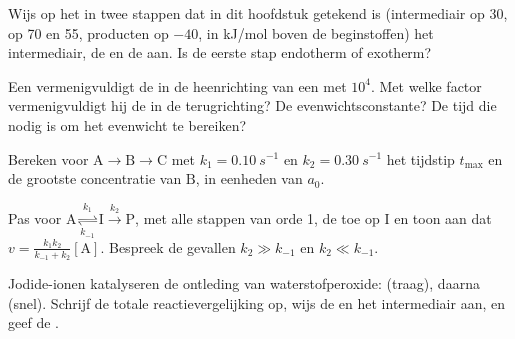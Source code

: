 \begin{exercise}[$\star$]\label{exo:b1:elementary-steps:3}
Wijs op het  in twee stappen dat in dit hoofdstuk getekend
is (intermediair op 30,  op 70 en 55, producten op
$-40$, in \unit{kJ/mol} boven de beginstoffen) het intermediair, de
 en de  aan. Is de eerste stap
endotherm of exotherm?
\end{exercise}

\begin{exercise}[$\star$]\label{exo:b1:elementary-steps:4}
Een  vermenigvuldigt de  in de heenrichting
van een  met $10^4$. Met welke factor vermenigvuldigt hij
de  in de terugrichting? De evenwichtsconstante? De
tijd die nodig is om het evenwicht te bereiken?
\end{exercise}

\begin{exercise}[$\star\star$]\label{exo:b1:elementary-steps:5}
Bereken voor $\mathrm{A} \to \mathrm{B} \to \mathrm{C}$ met $k_1 =
\qty{0.10}{s^{-1}}$ en $k_2 = \qty{0.30}{s^{-1}}$ het tijdstip $t_{\max}$
en de grootste concentratie van $\mathrm{B}$, in eenheden van $a_0$.
\end{exercise}

\begin{exercise}[$\star\star$]\label{exo:b1:elementary-steps:6}
Pas voor $\mathrm{A} \underset{k_{-1}}{\overset{k_1}{\rightleftharpoons}}
\mathrm{I} \xrightarrow{k_2} \mathrm{P}$, met alle stappen van orde 1, de
 toe op $\mathrm{I}$ en toon aan dat $v =
\frac{k_1k_2}{k_{-1} + k_2}[\mathrm{A}]$. Bespreek de gevallen $k_2 \gg
k_{-1}$ en $k_2 \ll k_{-1}$.
\end{exercise}

\begin{exercise}[$\star\star$]\label{exo:b1:elementary-steps:7}
Jodide-ionen katalyseren de ontleding van waterstofperoxide:
 (traag), daarna 
(snel). Schrijf de totale reactievergelijking op, wijs de  en
het intermediair aan, en geef de .
\end{exercise}

